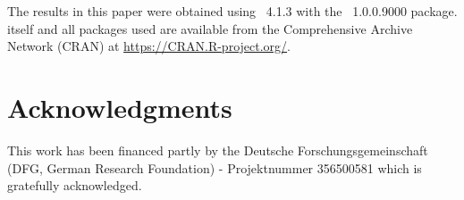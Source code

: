 \documentclass[article]{jss}
\begin{document}
The results in this paper were obtained using
~4.1.3 with the
~1.0.0.9000 package.  itself
and all packages used are available from the Comprehensive
 Archive Network (CRAN) at \url{https://CRAN.R-project.org/}.


\section*{Acknowledgments}

This work has been financed partly by the Deutsche Forschungsgemeinschaft (DFG, German Research Foundation) - Projektnummer 356500581 which is gratefully acknowledged.


\end{document}
